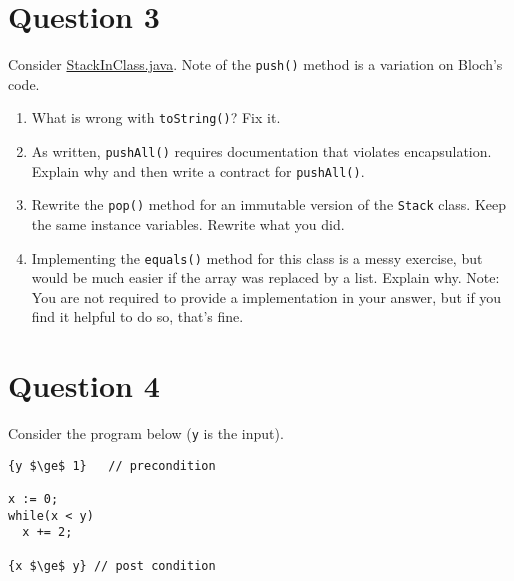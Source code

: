 \documentclass[10pt]{article}
\begin{document}
\newpage
\section{Question 3}

Consider \href{https://nguyenthanhvuh.github.io/class-oo/files/StackInClass.java}{StackInClass.java}.
Note of the {\tt push()} method is a variation on Bloch's code.

\begin{enumerate}
\item
What is wrong with {\tt toString()}?  Fix it.

\item
As written, {\tt pushAll()} requires documentation that violates encapsulation.  Explain why
and then write a contract for {\tt pushAll()}.

\item
Rewrite the {\tt pop()} method for an immutable version of the {\tt Stack} class.
Keep the same instance variables. Rewrite what you did.

\item
Implementing the {\tt equals()} method for this class is a messy exercise, but would
	be much easier if the array was replaced by a list.  Explain why.
	Note:  You are not required to provide a implementation in your answer,
	but if you find it helpful to do so, that's fine.
\end{enumerate}

\newpage
\section{Question 4}

Consider the program below (\texttt{y} is the input). 
\begin{lstlisting}
{y $\ge$ 1}   // precondition

x := 0;
while(x < y)
  x += 2;

{x $\ge$ y} // post condition
\end{lstlisting}
\end{document}
